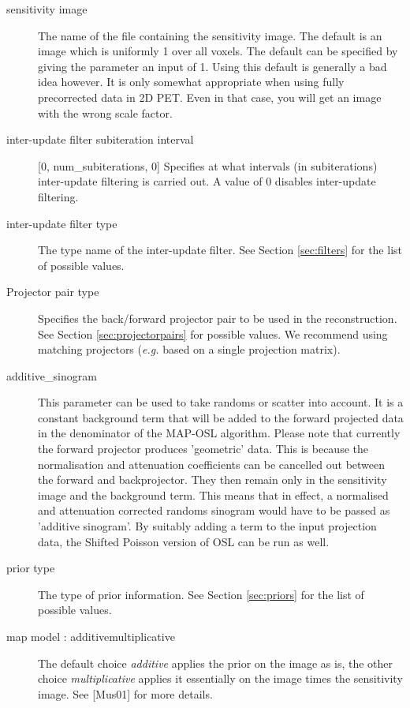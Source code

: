\documentclass{article}
\begin{document}
\begin{description}
\item[sensitivity image]
The name of the file containing the sensitivity image. The 
default is an image which is uniformly 1 over all voxels. The 
default can be specified by giving the parameter an input of 
1. Using this default is generally a bad idea however. It is 
only somewhat appropriate when using fully precorrected data 
in 2D PET. Even in that case, you will get an image with the 
wrong scale factor.


\item[inter-update filter subiteration interval] [0, num\_subiterations, 0{]}
Specifies at what intervals (in subiterations) inter-update filtering 
is carried out. A value of 0 disables inter-update filtering.


\item[inter-update filter type]
The type name of the inter-update filter. See Section \ref{sec:filters} for 
the list of possible values.



\item[Projector pair type]
Specifies the back/forward projector pair to be used in the reconstruction. 
See Section \ref{sec:projectorpairs} for possible values. We recommend using matching
projectors (\textit{e.g.} based on a single projection matrix).


\item[additive\_sinogram]
This parameter can be used to take randoms or scatter into account. 
It is a constant background term that will be added to the forward 
projected data in the denominator of the MAP-OSL algorithm. Please 
note that currently the forward projector produces 'geometric' 
data. This is because the normalisation and attenuation coefficients 
can be cancelled out between the forward and backprojector. They 
then remain only in the sensitivity image and the background 
term. This means that in effect, a normalised and attenuation 
corrected randoms sinogram would have to be passed as 'additive 
sinogram'. By suitably adding a term to the input projection 
data, the Shifted Poisson version of OSL can be run as well.

\item[prior type]
The type of prior information. See Section \ref{sec:priors} for the list 
of possible values.


\item[map model : additive{\textbar}multiplicative]
The default choice \textit{additive} applies the prior on the image 
as is, the other choice \textit{multiplicative} applies it essentially 
on the image times the sensitivity image. See [Mus01] for more 
details.



\end{description}
\end{document}
